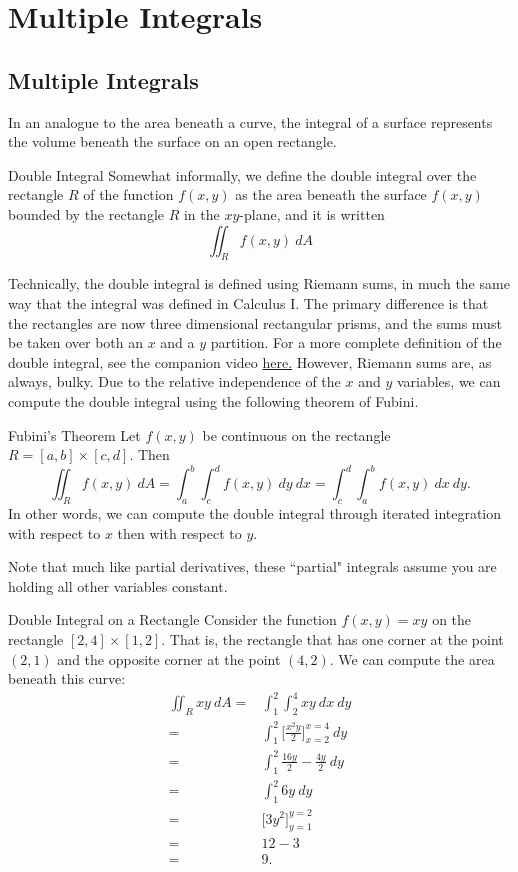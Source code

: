 \section{Multiple Integrals}
\subsection{Multiple Integrals}
In an analogue to the area beneath a curve, the integral of a surface represents the volume beneath the surface on an open rectangle.

\begin{definition}{Double Integral}
Somewhat informally, we define the double integral over the rectangle $R$ of the function $f(x,y)$ as the area beneath the surface $f(x,y)$ bounded by the rectangle $R$ in the $xy$-plane, and it is written $$\iint_R f(x,y) \ dA $$  
\end{definition}

Technically, the double integral is defined using Riemann sums, in much the same way that the integral was defined in Calculus I. The primary difference is that the rectangles are now three dimensional rectangular prisms, and the sums must be taken over both an $x$ and a $y$ partition. For a more complete definition of the double integral, see the companion video \href{https://www.youtube.com/watch?v=ga7g3kuoGBY}{here.} However, Riemann sums are, as always, bulky. Due to the relative independence of the $x$ and $y$ variables, we can compute the double integral using the following theorem of Fubini.

\begin{theorem}{Fubini's Theorem}
Let $f(x,y)$ be continuous on the rectangle $R=[a,b]\times[c,d]$. Then $$\iint_R f(x,y)\ dA=\int_{a}^{b}\int_{c}^{d}f(x,y)\ dy\ dx=\int_{c}^{d}\int_{a}^{b}f(x,y)\ dx\ dy.$$ In other words, we can compute the double integral through iterated integration with respect to $x$ then with respect to $y$.
\end{theorem}

Note that much like partial derivatives, these ``partial" integrals assume you are holding all other variables constant.

\begin{example}{Double Integral on a Rectangle}
Consider the function $f(x,y)=xy$ on the rectangle $[2,4]\times [1,2]$. That is, the rectangle that has one corner at the point $(2,1)$ and the opposite corner at the point $(4,2)$. We can compute the area beneath this curve:
\begin{align*}
\iint_{R}xy\ dA=&\int_{1}^2\int_2^4 xy\ dx\ dy\\
=&\int_{1}^2\Bigg[\frac{x^2y}{2} \Bigg]_{x=2}^{x=4} \ dy\\
=&\int_1^2\frac{16y}{2}-\frac{4y}{2} \ dy\\
=&\int_1^2 6y\ dy\\
=&\Bigg[3y^2\Bigg]_{y=1}^{y=2}\\
=&12-3\\
=&9.
\end{align*}
\end{example}

